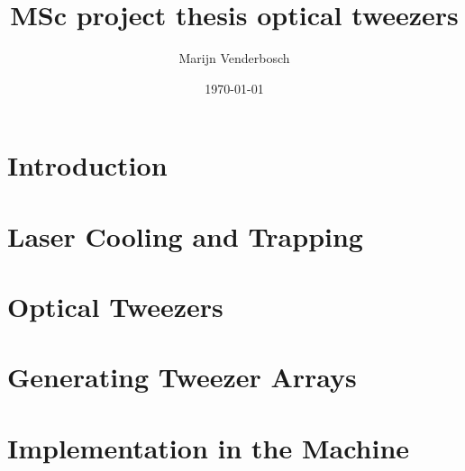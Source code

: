 \documentclass[a4paper, twoside, notitlepage]{report}
\title{MSc project thesis optical tweezers}
\author{Marijn Venderbosch}
\date{\normalsize \textsf{\today}}
\begin{document}

\clearpage

    \renewcommand{\abstractname}{\Large{Abstract}}
    \begin{abstract}
        \thispagestyle{plain}
        \vspace*{0.5cm}
        \normalsize
    \end{abstract}
    
    \clearpage
    
    \renewcommand{\abstractname}{\Large{Acknowledgements}}
    \begin{abstract}
        \thispagestyle{plain}
        \vspace*{0.5cm}
        \normalsize
    \end{abstract}
\restoregeometry


\tableofcontents
\newpage


\newpage


\chapter{Introduction}\label{ch:introduction}
    

\chapter{Laser Cooling and Trapping}\label{ch:coolingtrapping}
    

\chapter{Optical Tweezers}\label{ch:tweezer}
    

\chapter{Generating Tweezer Arrays}\label{ch:arrays}
    
    
\chapter{Implementation in the Machine}\label{ch:implementation}
\end{document}
